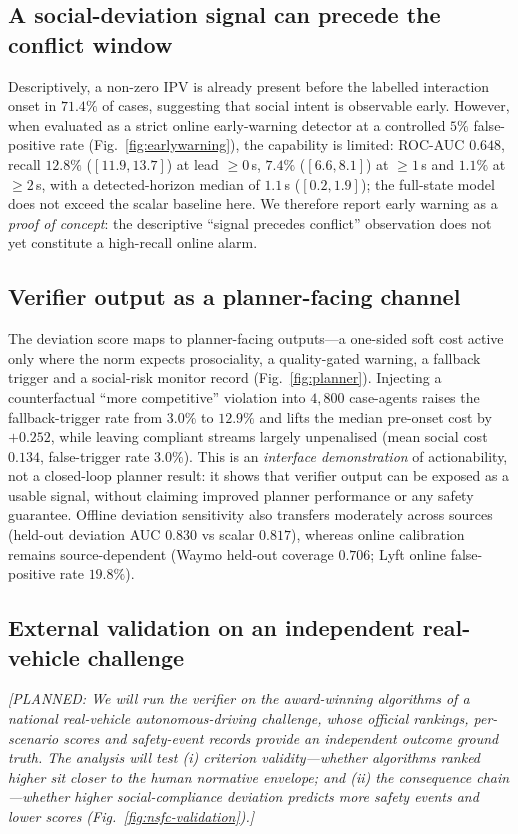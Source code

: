 \documentclass[12pt,a4paper]{article}
\newcommand{\planned}[1]{{\color{blue!60!black}\textit{[PLANNED: #1]}}}
\begin{document}
\subsection{A social-deviation signal can precede the conflict window}
Descriptively, a non-zero IPV is already present before the labelled interaction onset in
$71.4\%$ of cases, suggesting that social intent is observable early. However, when
evaluated as a strict online early-warning detector at a controlled $5\%$ false-positive
rate (Fig.~\ref{fig:earlywarning}), the capability is limited: ROC-AUC $0.648$, recall
$12.8\%$ ($[11.9,13.7]$) at lead $\ge0$\,s, $7.4\%$ ($[6.6,8.1]$) at $\ge1$\,s and $1.1\%$
at $\ge2$\,s, with a detected-horizon median of $1.1$\,s ($[0.2,1.9]$); the full-state model
does not exceed the scalar baseline here. We therefore report early warning as a
\emph{proof of concept}: the descriptive ``signal precedes conflict'' observation does not
yet constitute a high-recall online alarm.

\subsection{Verifier output as a planner-facing channel}
The deviation score maps to planner-facing outputs---a one-sided soft cost active only where
the norm expects prosociality, a quality-gated warning, a fallback trigger and a social-risk
monitor record (Fig.~\ref{fig:planner}). Injecting a counterfactual ``more competitive''
violation into $4{,}800$ case-agents raises the fallback-trigger rate from $3.0\%$ to
$12.9\%$ and lifts the median pre-onset cost by $+0.252$, while leaving compliant streams
largely unpenalised (mean social cost $0.134$, false-trigger rate $3.0\%$). This is an
\emph{interface demonstration} of actionability, not a closed-loop planner result: it shows
that verifier output can be exposed as a usable signal, without claiming improved planner
performance or any safety guarantee. Offline deviation sensitivity also transfers
moderately across sources (held-out deviation AUC $0.830$ vs scalar $0.817$), whereas online
calibration remains source-dependent (Waymo held-out coverage $0.706$; Lyft online
false-positive rate $19.8\%$).

\subsection{External validation on an independent real-vehicle challenge}
\planned{We will run the verifier on the award-winning algorithms of a national real-vehicle
autonomous-driving challenge, whose official rankings, per-scenario scores and safety-event
records provide an independent outcome ground truth. The analysis will test (i) criterion
validity---whether algorithms ranked higher sit closer to the human normative envelope; and
(ii) the consequence chain---whether higher social-compliance deviation predicts more
safety events and lower scores (Fig.~\ref{fig:nsfc-validation}).}
\end{document}
